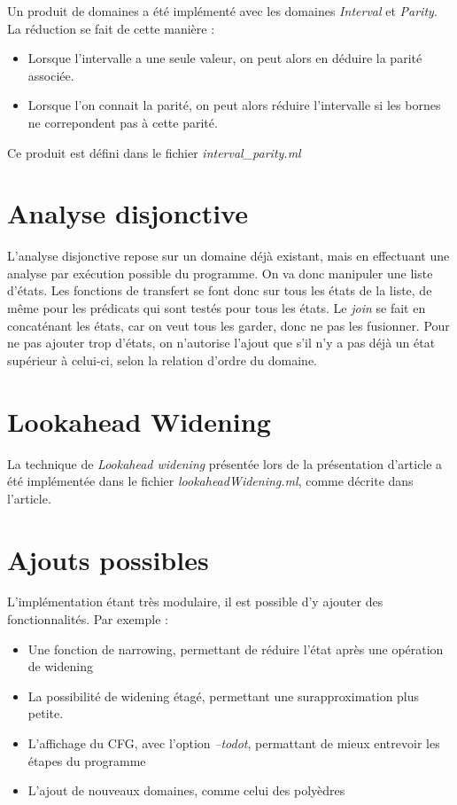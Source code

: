 \documentclass[a4paper, 11pt]{article}
\begin{document}
Un produit de domaines a été implémenté avec les domaines \emph{Interval} et \emph{Parity}.
La réduction se fait de cette manière :
\begin{itemize}
\item Lorsque l'intervalle a une seule valeur, on peut alors en déduire la parité associée.
\item Lorsque l'on connait la parité, on peut alors réduire l'intervalle si les bornes ne correpondent pas à cette parité.
\end{itemize}
Ce produit est défini dans le fichier \emph{interval\_parity.ml}

\section{Analyse disjonctive}
L'analyse disjonctive repose sur un domaine déjà existant, mais en effectuant une analyse par exécution possible du programme. On va donc manipuler une liste d'états. Les fonctions de transfert se font donc sur tous les états de la liste, de même pour les prédicats qui sont testés pour tous les états. Le \emph{join} se fait en concaténant les états, car on veut tous les garder, donc ne pas les fusionner. Pour ne pas ajouter trop d'états, on n'autorise l'ajout que s'il n'y a pas déjà un état supérieur à celui-ci, selon la relation d'ordre du domaine.

\section{Lookahead Widening}
La technique de \emph{Lookahead widening} présentée lors de la présentation d'article a été implémentée dans le fichier \emph{lookaheadWidening.ml}, comme décrite dans l'article.

\section{Ajouts possibles}
L'implémentation étant très modulaire, il est possible d'y ajouter des fonctionnalités.
Par exemple :
\begin{itemize}
\item Une fonction de narrowing, permettant de réduire l'état après une opération de widening
\item La possibilité de widening étagé, permettant une surapproximation plus petite.
\item L'affichage du CFG, avec l'option \emph{--todot}, permattant de mieux entrevoir les étapes du programme
\item L'ajout de nouveaux domaines, comme celui des polyèdres
\end{itemize}
\end{document}
